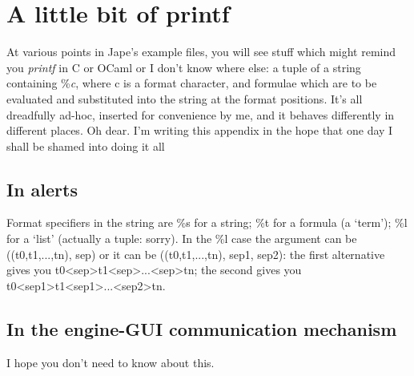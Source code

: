 \chapter{A little bit of printf}
\label{appx:sortofprintf}

At various points in Jape's example files, you will see stuff which might remind you \textit{printf} in C or OCaml or I don't know where else: a tuple of a string containing \%\textit{c}, where c is a format character, and formulae which are to be evaluated and substituted into the string at the format positions. It's all dreadfully ad-hoc, inserted for convenience by me, and it behaves differently in different places. Oh dear. I'm writing this appendix in the hope that one day I shall be shamed into doing it all 

\section{In alerts}
\label{sec:printfalerts}

Format specifiers in the string are  \%s for a string; \%t for a formula (a `term'); \%l for a `list' (actually a tuple: sorry). In the \%l case the argument can be ((t0,t1,...,tn), sep) or it can be ((t0,t1,...,tn), sep1, sep2): the first alternative gives you t0<sep>t1<sep>...<sep>tn; the second gives you t0<sep1>t1<sep1>...<sep2>tn.

\section{In the engine-GUI communication mechanism}

I hope you don't need to know about this.  